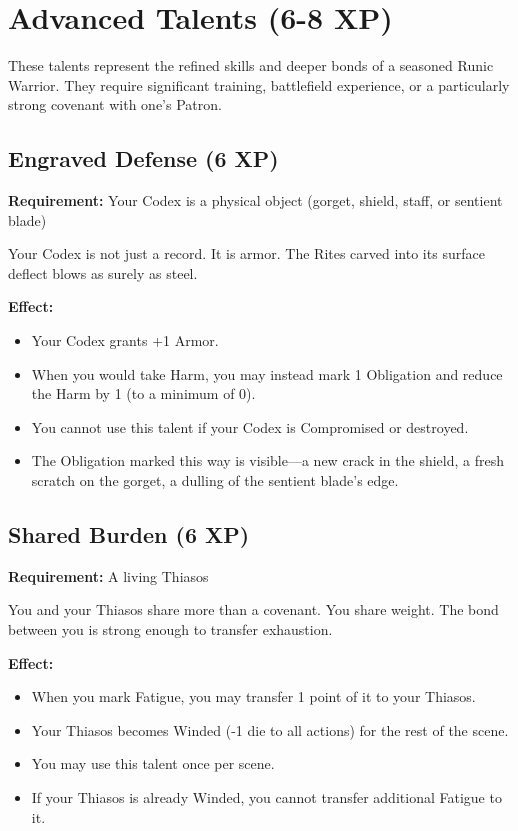 \section{Advanced Talents (6-8 XP)}

These talents represent the refined skills and deeper bonds of a seasoned Runic Warrior. They require significant training, battlefield experience, or a particularly strong covenant with one's Patron.

\subsection{Engraved Defense (6 XP)}

\textbf{Requirement:} Your Codex is a physical object (gorget, shield, staff, or sentient blade)

Your Codex is not just a record. It is armor. The Rites carved into its surface deflect blows as surely as steel.

\textbf{Effect:}
\begin{itemize}
\item Your Codex grants +1 Armor.
\item When you would take Harm, you may instead mark 1 Obligation and reduce the Harm by 1 (to a minimum of 0).
\item You cannot use this talent if your Codex is Compromised or destroyed.
\item The Obligation marked this way is visible—a new crack in the shield, a fresh scratch on the gorget, a dulling of the sentient blade's edge.
\end{itemize}

\subsection{Shared Burden (6 XP)}

\textbf{Requirement:} A living Thiasos

You and your Thiasos share more than a covenant. You share weight. The bond between you is strong enough to transfer exhaustion.

\textbf{Effect:}
\begin{itemize}
\item When you mark Fatigue, you may transfer 1 point of it to your Thiasos.
\item Your Thiasos becomes Winded (-1 die to all actions) for the rest of the scene.
\item You may use this talent once per scene.
\item If your Thiasos is already Winded, you cannot transfer additional Fatigue to it.
\end{itemize}

